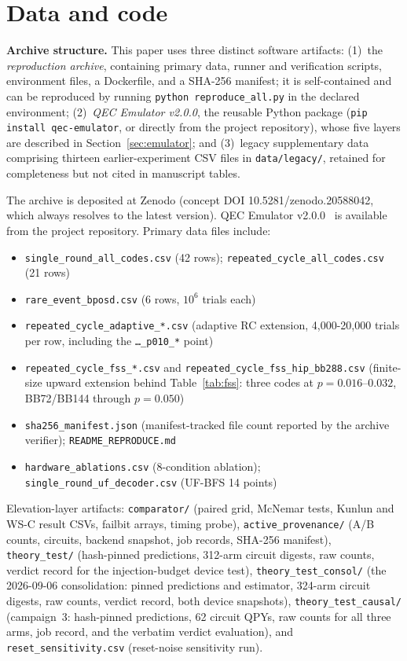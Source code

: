\documentclass[pdflatex,sn-mathphys-num]{sn-jnl}
\theoremstyle{thmstyleone}
\theoremstyle{thmstyletwo}
\theoremstyle{thmstylethree}
\begin{document}
\section*{Data and code}

\noindent\textbf{Archive structure.}
This paper uses three distinct software artifacts: (1)~the \emph{reproduction archive}, containing primary data, runner and verification scripts, environment files, a Dockerfile, and a SHA-256 manifest; it is self-contained and can be reproduced by running \texttt{python reproduce\_all.py} in the declared environment; (2)~\emph{QEC Emulator v2.0.0}, the reusable Python package (\texttt{pip install qec-emulator}, or directly from the project repository), whose five layers are described in Section~\ref{sec:emulator}; and (3)~legacy supplementary data comprising thirteen earlier-experiment CSV files in \texttt{data/legacy/}, retained for completeness but not cited in manuscript tables.

The archive is deposited at Zenodo (concept DOI 10.5281/zenodo.20588042, which always resolves to the latest version). QEC Emulator v2.0.0~\cite{AlDaajeh2026emulator} is available from the project repository. Primary data files include:
\begin{itemize}[leftmargin=1.4em,itemsep=0pt,topsep=2pt]
  \item \texttt{single\_round\_all\_codes.csv} (42 rows); \texttt{repeated\_cycle\_all\_codes.csv} (21 rows)
  \item \texttt{rare\_event\_bposd.csv} (6 rows, $10^{6}$ trials each)
  \item \texttt{repeated\_cycle\_adaptive\_*.csv} (adaptive RC extension, 4{,}000-20{,}000 trials per row, including the \texttt{\dots\_p010\_*} point)
  \item \texttt{repeated\_cycle\_fss\_*.csv} and \texttt{repeated\_cycle\_fss\_hip\_bb288.csv} (finite-size upward extension behind Table~\ref{tab:fss}: three codes at $p=0.016$--$0.032$, BB72/BB144 through $p=0.050$)
  \item \texttt{sha256\_manifest.json} (manifest-tracked file count reported by the archive verifier); \texttt{README\_REPRODUCE.md}
  \item \texttt{hardware\_ablations.csv} (8-condition ablation); \texttt{single\_round\_uf\_decoder.csv} (UF-BFS 14 points)
\end{itemize}
Elevation-layer artifacts: \texttt{comparator/} (paired grid, McNemar tests, Kunlun and WS-C result CSVs, failbit arrays, timing probe), \texttt{active\_provenance/} (A/B counts, circuits, backend snapshot, job records, SHA-256 manifest), \texttt{theory\_test/} (hash-pinned predictions, 312-arm circuit digests, raw counts, verdict record for the injection-budget device test), \texttt{theory\_test\_consol/} (the 2026-09-06 consolidation: pinned predictions and estimator, 324-arm circuit digests, raw counts, verdict record, both device snapshots), \texttt{theory\_test\_causal/} (campaign~3: hash-pinned predictions, 62 circuit QPYs, raw counts for all three arms, job record, and the verbatim verdict evaluation), and \texttt{reset\_sensitivity.csv} (reset-noise sensitivity run).
\end{document}
